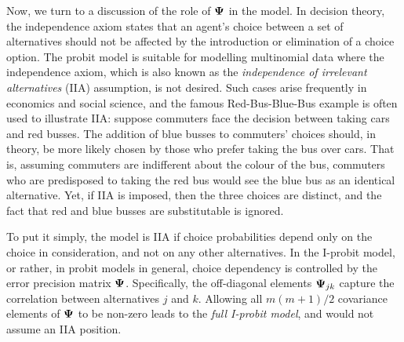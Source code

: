Now, we turn to a discussion of the role of ${\bm\Psi}$ in the model.
In decision theory, the independence axiom states that an agent's choice between a set of alternatives should not be affected by the introduction or elimination of a choice option.
The probit model is suitable for modelling multinomial data where the independence axiom, which is also known as the \emph{independence of irrelevant alternatives} (IIA) assumption, is not desired. 
Such cases arise frequently in economics and social science, and the famous Red-Bus-Blue-Bus example is often used to illustrate IIA:
suppose commuters face the decision between taking cars and red busses. 
The addition of blue busses to commuters' choices should, in theory, be more likely chosen by those who prefer taking the bus over cars.
That is, assuming commuters are indifferent about the colour of the bus, commuters who are predisposed to taking the red bus would see the blue bus as an identical alternative.
 Yet, if IIA is imposed, then the three choices are distinct, and the fact that red and blue busses are substitutable is ignored.

To put it simply, the model is IIA if choice probabilities depend only on the choice in consideration, and not on any other alternatives.
In the I-probit model, or rather, in probit models in general, choice dependency is controlled by the error precision matrix ${\bm\Psi}$.
Specifically, the off-diagonal elements ${\bm\Psi}_{jk}$ capture the correlation between alternatives $j$ and $k$.
Allowing all $m(m+1)/2$ covariance elements of ${\bm\Psi}$ to be non-zero leads to the \emph{full I-probit model}, and would not assume an IIA position.





